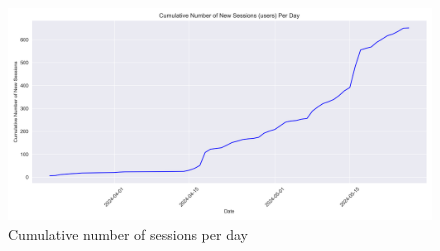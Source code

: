 \begin{figure}[H]
    \centering
    \includegraphics[width=\textwidth]{results/plots/assets/usage-06-number-of-sessions-per-day.png}
    \caption{Cumulative number of sessions per day}
    \label{fig:usage_06_number_of_sessions_per_day}
\end{figure}